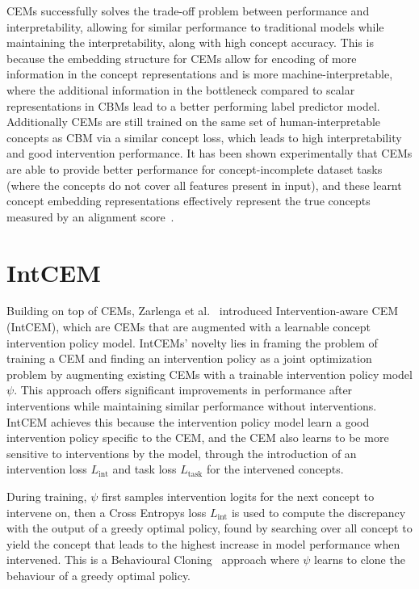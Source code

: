\documentclass[../main.tex]{subfiles}
\begin{document}
CEMs successfully solves the trade-off problem between performance and interpretability,
allowing for similar performance to traditional models while maintaining the
interpretability, along with high concept accuracy. This is because the embedding structure
for CEMs allow for encoding of more information
in the concept representations and is more machine-interpretable, where
the additional information in the bottleneck
 compared to scalar representations in CBMs
lead to a better performing label predictor model. Additionally CEMs are still trained 
on the same set of human-interpretable concepts as CBM via a similar concept loss, which leads to
high interpretability and good intervention performance. It has been shown experimentally
that CEMs are able to provide better performance for concept-incomplete dataset tasks (where
the concepts do not cover all features present in input), and these learnt concept
embedding representations effectively represent the true concepts measured by an alignment score~\cite{cem}.

\section{IntCEM} %

Building on top of CEMs, Zarlenga et al.~\cite{intcem} introduced 
Intervention-aware CEM (IntCEM), which are CEMs that are augmented
with a learnable concept intervention policy model. IntCEMs' novelty
lies in framing the problem of training a CEM and finding
an intervention policy as a joint optimization problem by augmenting
existing CEMs with a trainable intervention policy model $\psi$. 
This approach offers significant improvements in performance after 
interventions while maintaining similar performance without 
interventions. 
IntCEM achieves this because the intervention policy model
learn a good intervention policy specific to the CEM, 
and the CEM also learns to be more sensitive to interventions
by the model, through the introduction of an intervention loss 
$L_{\text{int}}$ and task loss $L_{\text{task}}$ for 
the intervened concepts.

During training, $\psi$ first samples intervention
logits for the next concept to intervene on, then 
a Cross Entropys loss $L_{\text{int}}$ is used to
compute the discrepancy with the output of a greedy 
optimal policy, found by searching over all concept to
yield the concept that leads to the highest increase
in model performance when intervened. This is a Behavioural
Cloning~\cite{} approach where $\psi$ learns to clone the behaviour of
a greedy optimal policy.
\end{document}
